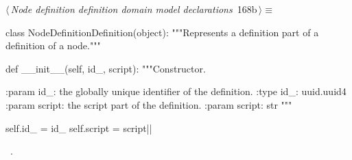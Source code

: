 \documentclass[%
    a4paper,    %
    justified,  %
    nobib,      %
    openany     %
]{tufte-book}
\begin{document}
\begin{flushleft} \small
\begin{minipage}{\linewidth}\label{scrap198}\raggedright\small
{} $\langle\,${\itshape Node definition definition domain model declarations}\nobreak\ {\footnotesize {168b}}$\,\rangle\equiv$
\vspace{-1ex}
\begin{pythoncode}
class NodeDefinitionDefinition(object):
    """Represents a definition part of a definition of a node."""

    def __init__(self, id_, script):
        """Constructor.

        :param id_: the globally unique identifier of the definition.
        :type  id_: uuid.uuid4
        :param script: the script part of the definition.
        :param script: str
        """

        self.id_ = id_
        self.script = script|\NWsep|
\end{pythoncode}
\vspace{1.5ex}
\footnotesize
\begin{list}{}{\setlength{\itemsep}{-\parsep}\setlength{\itemindent}{-\leftmargin}}
\item \NWtxtMacroRefIn\ .

\item{}
\end{list}
\end{minipage}\vspace{4ex}
\end{flushleft}
\end{document}
